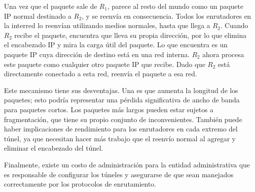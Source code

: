 Una vez que el paquete sale de \(R_1\), parece al resto del mundo como un paquete IP normal destinado a \(R_2\), y se reenvía en consecuencia. Todos los enrutadores en la interred lo reenvían utilizando medios normales, hasta que llega a \(R_2\). Cuando \(R_2\) recibe el paquete, encuentra que lleva su propia dirección, por lo que elimina el encabezado IP y mira la carga útil del paquete. Lo que encuentra es un paquete IP cuya dirección de destino está en una red interna. \(R_2\) ahora procesa este paquete como cualquier otro paquete IP que recibe. Dado que \(R_2\) está directamente conectado a esta red, reenvía el paquete a esa red.

Este mecanismo tiene sus desventajas. Una es que aumenta la longitud de los paquetes; esto podría representar una pérdida significativa de ancho de banda para paquetes cortos. Los paquetes más largos pueden estar sujetos a fragmentación, que tiene su propio conjunto de inconvenientes. También puede haber implicaciones de rendimiento para los enrutadores en cada extremo del túnel, ya que necesitan hacer más trabajo que el reenvío normal al agregar y eliminar el encabezado del túnel.

Finalmente, existe un costo de administración para la entidad administrativa que es responsable de configurar los túneles y asegurarse de que sean manejados correctamente por los protocolos de enrutamiento.